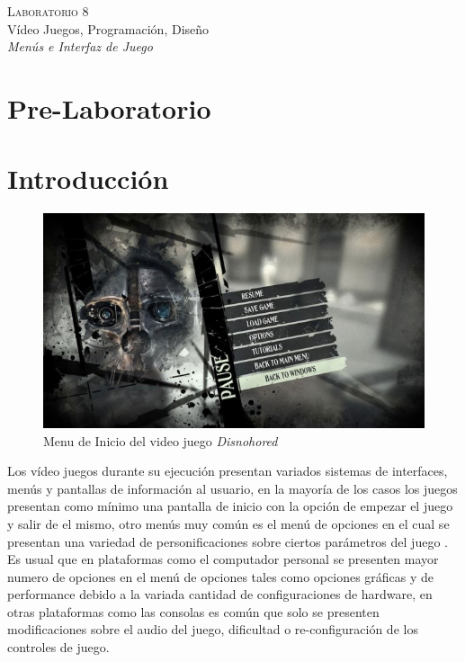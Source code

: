 \begin{center}
\textsc{\Large Laboratorio 8}~\\
{\large Vídeo Juegos, Programación, Diseño}~\\
\emph{Menús e Interfaz de Juego}
\end{center}

\section{Pre-Laboratorio}

\section{Introducción}
\setlength\intextsep{0pt}
\begin{figure}
\includegraphics[width=\linewidth]{semana8/dishonored_menu.jpg} 
\caption{Menu de Inicio del video juego \emph{Disnohored}}
\end{figure}
Los vídeo juegos durante su ejecución presentan variados sistemas de interfaces, menús y pantallas de información al usuario, en la mayoría de los casos los juegos presentan como mínimo una pantalla de inicio con la opción de empezar el juego y salir de el mismo, otro menús muy común es el menú de opciones en el cual se presentan una variedad de personificaciones sobre ciertos parámetros del juego \cite{gb_optionsmenu}. Es usual que en plataformas como el computador personal se presenten mayor numero de opciones en el menú de opciones tales como opciones gráficas y de performance debido a la variada cantidad de configuraciones de hardware, en otras plataformas como las consolas es común que solo se presenten modificaciones sobre el audio del juego, dificultad o re-configuración de los controles de juego.

